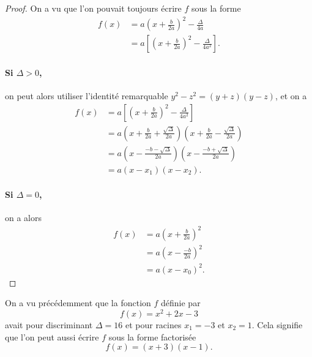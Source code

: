 \documentclass[11pt]{article}
\begin{document}
\begin{proof}
  On a vu que l'on pouvait toujours écrire $f$ sous la forme
\begin{align*}
  f(x) &= a\left( x+\frac{b}{2a} \right)^2-\frac{\Delta}{4a} \\
  &= a\left[ \left( x+\frac{b}{2a} \right)^2-\frac{\Delta}{4a^2} \right].
\end{align*}
\paragraph{Si $\Delta>0$,} on peut alors utiliser l'identité remarquable
$y^2-z^2=(y+z)(y-z)$, et on a
\begin{align*}
  f(x) &= a\left[ \left( x+\frac{b}{2a} \right)^2-\frac{\Delta}{4a^2} \right] \\
  &= a\left( x+\frac{b}{2a}+\frac{\sqrt\Delta}{2a} \right)\left(
  x+\frac{b}{2a}-\frac{\sqrt\Delta}{2a}\right) \\
  &= a\left( x-\frac{-b-\sqrt\Delta}{2a}\right)\left(
  x-\frac{-b+\sqrt\Delta}{2a}\right) \\
  &= a(x-x_1)(x-x_2).
\end{align*}
\paragraph{Si $\Delta=0$,} on a alors
\begin{align*}
  f(x) &= a\left(x+\frac{b}{2a}  \right)^2 \\
  &= a\left(x-\frac{-b}{2a}  \right)^2 \\
  &= a(x-x_0)^2.
\end{align*}
\end{proof}

\begin{exemple}
  On a vu précédemment que la fonction $f$ définie par
  \[
    f(x) = x^2+2x-3
  \]
  avait pour discriminant $\Delta=16$ et pour racines $x_1=-3$ et $x_2=1$. Cela
  signifie que l'on peut aussi écrire $f$ sous la forme factorisée
  \[
    f(x) = (x+3)(x-1).
  \]
\end{exemple}
\end{document}
